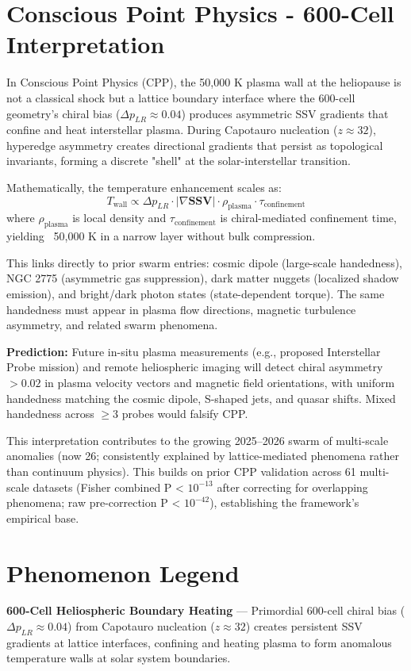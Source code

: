 \documentclass[11pt]{article}
\begin{document}
\section{Conscious Point Physics - 600-Cell Interpretation}
In Conscious Point Physics (CPP), the 50,000 K plasma wall at the heliopause is not a classical shock but a lattice boundary interface where the 600-cell geometry's chiral bias ($\Delta p_{LR} \approx 0.04$) produces asymmetric SSV gradients that confine and heat interstellar plasma. During Capotauro nucleation ($z \approx 32$), hyperedge asymmetry creates directional gradients that persist as topological invariants, forming a discrete "shell" at the solar-interstellar transition.

Mathematically, the temperature enhancement scales as:
\[
T_{\text{wall}} \propto \Delta p_{LR} \cdot |\nabla \mathbf{SSV}| \cdot \rho_{\text{plasma}} \cdot \tau_{\text{confinement}}
\]
where $\rho_{\text{plasma}}$ is local density and $\tau_{\text{confinement}}$ is chiral-mediated confinement time, yielding ~50,000 K in a narrow layer without bulk compression.

This links directly to prior swarm entries: cosmic dipole (large-scale handedness), NGC 2775 (asymmetric gas suppression), dark matter nuggets (localized shadow emission), and bright/dark photon states (state-dependent torque). The same handedness must appear in plasma flow directions, magnetic turbulence asymmetry, and related swarm phenomena.

\textbf{Prediction:} Future in-situ plasma measurements (e.g., proposed Interstellar Probe mission) and remote heliospheric imaging will detect chiral asymmetry $>0.02$ in plasma velocity vectors and magnetic field orientations, with uniform handedness matching the cosmic dipole, S-shaped jets, and quasar shifts. Mixed handedness across $\geq 3$ probes would falsify CPP.

This interpretation contributes to the growing 2025--2026 swarm of multi-scale anomalies (now 26; consistently explained by lattice-mediated phenomena rather than continuum physics). This builds on prior CPP validation across 61 multi-scale datasets (Fisher combined P < $10^{-13}$ after correcting for overlapping phenomena; raw pre-correction P < $10^{-42}$), establishing the framework's empirical base.

\section{Phenomenon Legend}
\textbf{600-Cell Heliospheric Boundary Heating} — Primordial 600-cell chiral bias ($\Delta p_{LR} \approx 0.04$) from Capotauro nucleation ($z \approx 32$) creates persistent SSV gradients at lattice interfaces, confining and heating plasma to form anomalous temperature walls at solar system boundaries.
\end{document}

